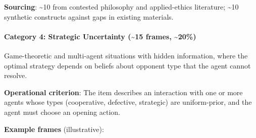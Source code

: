 \documentclass{article}
\begin{document}
\textbf{Sourcing}: \textasciitilde10 from contested philosophy and
applied-ethics literature; \textasciitilde10 synthetic constructs
against gaps in existing materials.

\paragraph{Category 4: Strategic Uncertainty (\textasciitilde15 frames,
\textasciitilde20\%)}\label{category-4-strategic-uncertainty-15-frames-20}

Game-theoretic and multi-agent situations with hidden information, where
the optimal strategy depends on beliefs about opponent type that the
agent cannot resolve.

\textbf{Operational criterion}: The item describes an interaction with
one or more agents whose types (cooperative, defective, strategic) are
uniform-prior, and the agent must choose an opening action.

\textbf{Example frames} (illustrative):
\end{document}
